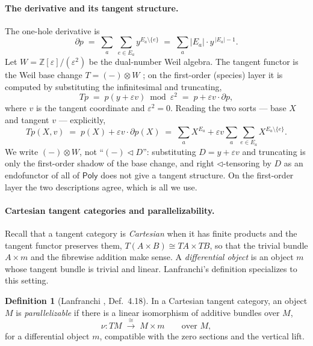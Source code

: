 \documentclass[11pt]{article}
\theoremstyle{definition}
\newtheorem{definition}[theorem]{Definition}
\newcommand{\Poly}{\mathsf{Poly}}
\newcommand{\Z}{\mathbb{Z}}
\begin{document}
\paragraph{The derivative and its tangent structure.}
The one-hole derivative \cite{AAGM2003} is
\[
   \partial p \;=\; \sum_{a}\ \sum_{e\in E_a} y^{E_a\setminus\{e\}}
             \;=\; \sum_a |E_a|\cdot y^{\,|E_a|-1}.
\]
Let $W=\Z[\varepsilon]/(\varepsilon^2)$ be the dual-number Weil algebra. The tangent functor is the
Weil base change $T=(-)\otimes W$ \cite{MacBethCartan}; on the first-order (species) layer it is
computed by substituting the infinitesimal and truncating,
\begin{equation}\label{eq:T}
   Tp \;=\; p(y+\varepsilon v)\bmod\varepsilon^2 \;=\; p + \varepsilon v\cdot\partial p,
\end{equation}
where $v$ is the tangent coordinate and $\varepsilon^2=0$. Reading the two sorts --- base $X$ and
tangent $v$ --- explicitly,
\begin{equation}\label{eq:Ttwosort}
   Tp(X,v) \;=\; p(X) + \varepsilon v\cdot\partial p(X)
            \;=\; \sum_a X^{E_a} + \varepsilon v\sum_a\sum_{e\in E_a} X^{E_a\setminus\{e\}} .
\end{equation}
We write $(-)\otimes W$, not ``$(-)\lhd D$'': substituting $D=y+\varepsilon v$ and truncating is
only the first-order shadow of the base change, and right $\lhd$-tensoring by $D$ as an
endofunctor of all of $\Poly$ does not give a tangent structure. On the first-order layer the two
descriptions agree, which is all we use.

\paragraph{Cartesian tangent categories and parallelizability.}
Recall \cite{CockettCruttwell2014} that a tangent category is \emph{Cartesian} when it has finite
products and the tangent functor preserves them, $T(A\times B)\cong TA\times TB$, so that the
trivial bundle $A\times m$ and the fibrewise addition make sense. A \emph{differential object} is
an object $m$ whose tangent bundle is trivial and linear. Lanfranchi's definition specializes to
this setting.

\begin{definition}[Lanfranchi \cite{Lanfranchi2026}, Def.~4.18]\label{def:par}
In a Cartesian tangent category, an object $M$ is \emph{parallelizable} if there is a linear
isomorphism of additive bundles over $M$,
\[
   \nu\colon TM \;\xrightarrow{\ \cong\ }\; M\times m \qquad\text{over } M,
\]
for a differential object $m$, compatible with the zero sections and the vertical lift.
\end{definition}
\end{document}
